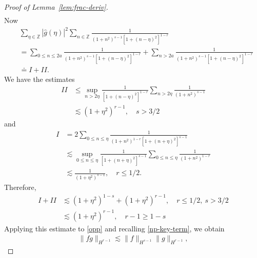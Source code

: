 \documentclass[12pt,reqno]{amsart}
\numberwithin{equation}{section}  %
\numberwithin{figure}{section}
\newcommand{\zz}{\mathbb{Z}}
\newcommand{\wh}{\widehat}
\begin{document}
\begin{proof}[Proof of Lemma~\ref{lem:frac-deriv}]
\begin{equation}
\begin{split}
  \end{split}
\end{equation}
%
Now 
\begin{equation*}
    \begin{split}
& \sum_{\eta \in \zz}| \wh{g}(\eta) |^{2} \sum_{n \in \zz}  
  \frac{1}{(1 + n^{2})^{s-1}[1 + (n - \eta)^{2}]^{1-r}}  
  \\
  & = 
  \sum_{0 \le n \le 2a} \frac{1}{(1 + n^{2})^{s-1}[1 + (n - \eta)^{2}]^{1-r}} 
  + \sum_{n > 2a} \frac{1}{(1 + n^{2})^{s-1}[1 + (n - \eta)^{2}]^{1-r}}
  \\
  & \doteq I + II.
 \end{split} 
  \end{equation*}
%
We have the estimates
%
%
\begin{equation*}
\begin{split}
    II 
    & \le \sup_{n > 2\eta} \frac{1}{\left[ 1 + (n-\eta)^{2} \right]^{1-r}}
    \sum_{n > 2\eta} \frac{1}{(1 + n^{2})^{s-1}} 
    \\
    & \lesssim (1 + \eta^{2})^{r-1}, \quad
    s > 3/2
\end{split}
\end{equation*}
%
and
%
%
%
\begin{equation*}
\begin{split}
    I & = 2 \sum_{0 \le n \le \eta} \frac{1}{\left( 1 + n^{2} \right)^{1-r} \left[
        1 + (n + \eta)^{2} \right]^{s-1}}
        \\
        & \lesssim \sup_{0 \le n \le \eta} \frac{1}{\left[ 1 + (n + \eta)^{2}
            \right]^{s-1}} \sum_{0 \le n \le \eta} \frac{1}{(1 + n^{2})^{1-r}}
            \\
            & \lesssim \frac{1}{(1 + \eta^{2})^{s-1}}, \quad r \le 1/2.
\end{split}
\end{equation*}
%
%
Therefore, 
%
%
%
\begin{equation*}
\begin{split}
    I + II & \lesssim (1 + \eta^{2})^{1-s} + (1 + \eta^{2})^{r-1}, \quad r \le 1/2, \ s > 3/2
    \\
    & \lesssim  (1 + \eta^{2})^{r-1}, \quad r -1 \ge 1-s
\end{split}
\end{equation*}
%
Applying this estimate to \eqref{opp} and recalling \eqref{np-key-term},
we obtain
%
%
%
%
\begin{equation}
  \label{yhh}
\begin{split}
  \| f g \|_{H^{r-1}} \lesssim \| f \|_{H^{s-1}} \| g \|_{H^{r-1}},

\end{split}
\end{equation}
\end{proof}
\end{document}

